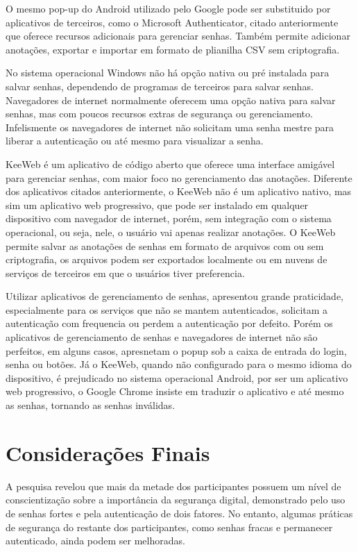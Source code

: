 \documentclass[12pt]{article}
\begin{document}
O mesmo pop-up do Android utilizado pelo Google pode ser substituido por
aplicativos de terceiros, como o Microsoft Authenticator, citado anteriormente
que oferece recursos adicionais para gerenciar senhas.
Também permite adicionar anotações, exportar e importar em formato de plianilha
CSV sem criptografia.

No sistema operacional Windows não há opção nativa ou pré instalada para
salvar senhas, dependendo de programas de terceiros para salvar senhas.
Navegadores de internet normalmente oferecem uma opção nativa para salvar senhas,
mas com poucos recursos extras de segurança ou gerenciamento.
Infelismente os navegadores de internet não solicitam uma senha mestre para liberar
a autenticação ou até mesmo para visualizar a senha.

KeeWeb é um aplicativo de código aberto que oferece uma interface amigável para
gerenciar senhas, com maior foco no gerenciamento das anotações.
Diferente dos aplicativos citados anteriormente, o KeeWeb não é um aplicativo
nativo, mas sim um aplicativo web progressivo, que pode ser instalado em qualquer
dispositivo com navegador de internet, porém, sem integração com o sistema
operacional, ou seja, nele, o usuário vai apenas realizar anotações.
O KeeWeb permite salvar as anotações de senhas em formato de arquivos com ou sem
criptografia, os arquivos podem ser exportados localmente ou em nuvens de
serviços de terceiros em que o usuários tiver preferencia.

Utilizar aplicativos de gerenciamento de senhas, apresentou grande praticidade,
especialmente para os serviços que não se mantem autenticados, solicitam a
autenticação com frequencia ou perdem a autenticação por defeito.
Porém os aplicativos de gerenciamento de senhas e navegadores de internet não
são perfeitos, em alguns casos, apresnetam o popup sob a caixa de entrada do
login, senha ou botões.
Já o KeeWeb, quando não configurado para o mesmo idioma do dispositivo, é
prejudicado no sistema operacional Android, por ser um aplicativo web progressivo,
o Google Chrome insiste em traduzir o aplicativo e até mesmo as senhas, tornando
as senhas inválidas.

\section{Considerações Finais}

A pesquisa revelou que mais da metade dos participantes possuem um nível de
conscientização sobre a importância da segurança digital, demonstrado pelo uso de
senhas fortes e pela autenticação de dois fatores.
No entanto, algumas práticas de segurança do restante dos participantes, como senhas
fracas e permanecer autenticado, ainda podem ser melhoradas.
\end{document}
